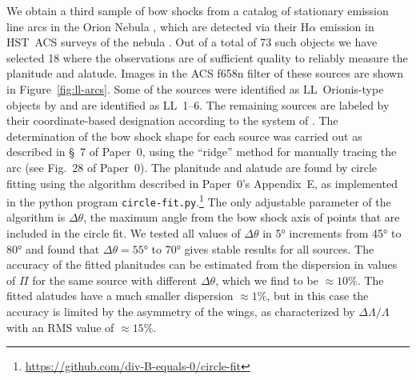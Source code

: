 We obtain a third sample of bow shocks from a catalog of stationary
emission line arcs in the Orion Nebula \citep{Bally:2000a}, which are
detected via their H\(\alpha\) emission in HST~ACS surveys of the nebula
\citep{Bally:2006a, Robberto:2013a}.  Out of a total of 73 such
objects \citep{Gutierrez-Soto:2015a} we have selected 18 where the
observations are of sufficient quality to reliably measure the
planitude and alatude.  Images in the ACS f658n filter of these
sources are shown in Figure~\ref{fig:ll-arcs}.  Some of the sources
were identified as LL~Orionis-type objects by \citet{Bally:2001a} and
are identified as LL~1--6. The remaining sources are labeled by their
coordinate-based designation according to the system of
\citet{ODell:1994a}.  The determination of the bow shock shape for
each source was carried out as described in \S~7 of Paper~0, using the
``ridge'' method for manually tracing the arc (see Fig.~28 of
Paper~0).  The planitude and alatude are found by circle fitting using
the algorithm described in Paper~0's Appendix~E, as implemented in the
python program
\texttt{circle-fit.py}.\footnote{\url{https://github.com/div-B-equals-0/circle-fit}}
The only adjustable parameter of the algorithm is \(\Delta\theta\), the maximum
angle from the bow shock axis of points that are included in the
circle fit.  We tested all values of \(\Delta\theta\) in \ang{5} increments from
\ang{45} to \ang{80} and found that \(\Delta\theta = \ang{55}\) to \ang{70}
gives stable results for all sources.  The accuracy of the fitted
planitudes can be estimated from the dispersion in values of \(\Pi\) for
the same source with different \(\Delta\theta\), which we find to be
\(\approx 10\%\).  The fitted alatudes have a much smaller dispersion
\(\approx 1 \%\), but in this case the accuracy is limited by the asymmetry
of the wings, as characterized by \(\Delta\Lambda/\Lambda\) with an RMS value of
\(\approx 15\%\).



